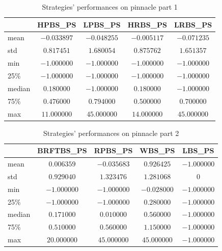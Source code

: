 \documentclass[preprint,aps,nofootinbib,a4paper,superscriptaddress,longbibliography,amsfonts,amssymb,amsmath,titlepage]{revtex4-2}
\begin{document}
\begin{table}[h]
\centering
\caption{Strategies' performances on pinnacle part 1}
\begin{tabular}{|l|c|c|c|c|}
\hline
& \textbf{HPBS\_PS} & \textbf{LPBS\_PS} & \textbf{HRBS\_PS} & \textbf{LRBS\_PS} \\
\hline
mean & $-0.033897$ & $-0.048255$ & $-0.005117	$ & $-0.071235$ \\
\hline
std & $0.817451$ & $1.680054$ & $0.875762	$ & $1.651357$ \\
\hline
min & $-1.000000$ & $-1.000000$ & $-1.000000$ & $-1.000000$ \\
\hline
25\% & $-1.000000$ & $-1.000000$ & $-1.000000$ & $-1.000000$ \\
\hline
median & $0.180000$ & $-1.000000$ & $0.180000$ & $-1.000000$ \\
\hline
75\% & $0.476000$ & $0.794000$ & $0.500000$ & $0.700000$ \\
\hline
max & $11.000000$ & $45.000000$ & $14.000000$ & $45.000000$ \\
\hline
\end{tabular}

\label{strategies-preformance-pinnacle-1}
\end{table}
%
%
\begin{table}[h]
\centering
\caption{Strategies' performances on pinnacle part 2}
\begin{tabular}{|l|c|c|c|c|}
\hline
& \textbf{BRFTBS\_PS} & \textbf{RPBS\_PS} & \textbf{WBS\_PS} & \textbf{LBS\_PS} \\
\hline
mean & $0.006359$ & $-0.035683$ & $0.926425$ & $-1.000000$ \\
\hline
std & $0.929040$ & $1.323476$ & $1.281068$ & $0$ \\
\hline
min & $-1.000000$ & $-1.000000$ & $-0.028000$ & $-1.000000$ \\
\hline
25\% & $-1.000000$ & $-1.000000$ & $0.280000$ & $-1.000000$ \\
\hline
median & $0.171000$ & $0.010000$ & $0.560000$ & $-1.000000$ \\
\hline
75\% & $0.510000$ & $0.560000$ & $1.150000$ & $-1.000000$ \\
\hline
max & $20.000000$ & $45.000000$ & $45.000000$ & $-1.000000$ \\
\hline
\end{tabular}

\label{strategies-preformance-pinnacle-2}
\end{table}
%
%
\end{document}
